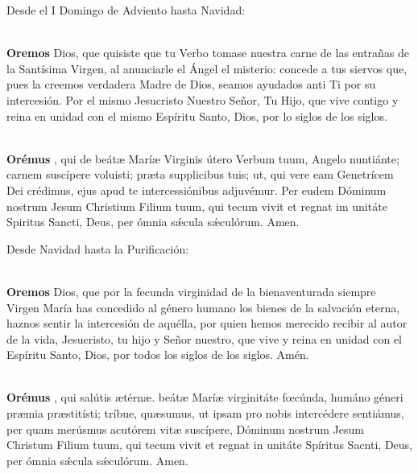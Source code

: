 \documentclass[10pt,a4paper,oneside]{book}
\begin{document}
\noindent\small{Desde el I Domingo de Adviento hasta Navidad:}\\
\begin{minipage}[t]{0.475\textwidth}
      \\[2mm]
      \textbf{Oremos}
       Dios, que quisiste que tu Verbo tomase nuestra carne de las entrañas de la Santísima Virgen, al anunciarle el Ángel el misterio: concede a tus siervos que, pues
      la creemos verdadera Madre de Dios, seamos ayudados anti Ti por su intercesión. Por el mismo Jesucristo Nuestro Señor, Tu Hijo, que vive contigo y reina en unidad con el mismo Espíritu
      Santo, Dios, por lo siglos de los siglos.
\end{minipage}
\begin{minipage}[t]{0.475\textwidth}
      \\[2mm]
      \textbf{Orémus}
      , qui de beát{\ae} Marí{\ae} Virginis útero Verbum tuum, Angelo nuntiánte; carnem suscípere voluisti; pr{\ae}ta supplicibus tuis; ut, qui vere eam Genetrícem
      Dei crédimus, ejus apud te intercessiónibus adjuvémur. Per eudem Dóminum nostrum Jesum Christium Filium tuum, qui tecum vivit et regnat im unitáte Spiritus Sancti, Deus, per ómnia
      s{\'\ae}cula s{\'\ae}culórum. Amen.
\end{minipage}

\bigskip

\noindent\small{Desde Navidad hasta la Purificación:}\\
\begin{minipage}[t]{0.475\textwidth}
      \\[2mm]
      \textbf{Oremos}
       Dios, que por la fecunda virginidad de la bienaventurada siempre Virgen María has concedido al género humano los bienes de la salvación eterna, haznos sentir
      la intercesión de aquélla, por quien hemos merecido recibir al autor de la vida, Jesucristo, tu hijo y Señor nuestro, que vive y reina en unidad con el Espíritu Santo, Dios, por
      todos los siglos de los siglos. Amén.
\end{minipage}
\begin{minipage}[t]{0.475\textwidth}
      \\[2mm]
      \textbf{Orémus}
      , qui salútis {\ae}térn{\ae}. beát{\ae} Marí{\ae} virginitáte f{\oe}cúnda, humáno géneri pr{\ae}mia pr{\ae}stitísti; tríbue, qu{\ae}sumus, ut ipsam pro nobis
      intercédere sentiámus, per quam merúsmus acutórem vit{\ae} suscípere, Dóminum nostrum Jesum Christum Filium tuum, qui tecum vivit et regnat in unitáte Spíritus Sacnti, Deus, per ómnia
      s{\'\ae}cula s{\'\ae}culórum. Amen.
\end{minipage}
\end{document}
